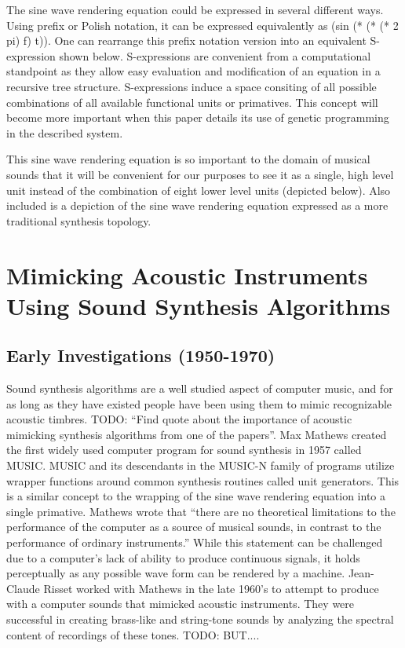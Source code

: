 \documentclass[12pt]{article}
\begin{document}
The sine wave rendering equation could be expressed in several different ways. Using prefix or Polish notation, it can be expressed equivalently as (sin (* (* (* 2 pi) f) t)). One can rearrange this prefix notation version into an equivalent S-expression shown below. S-expressions are convenient from a computational standpoint as they allow easy evaluation and modification of an equation in a recursive tree structure. S-expressions induce a space consiting of all possible combinations of all available functional units or primatives. This concept will become more important when this paper details its use of genetic programming in the described system.
	
This sine wave rendering equation is so important to the domain of musical sounds that it will be convenient for our purposes to see it as a single, high level unit instead of the combination of eight lower level units (depicted below). Also included is a depiction of the sine wave rendering equation expressed as a more traditional synthesis topology.
	
\section{Mimicking Acoustic Instruments Using Sound Synthesis Algorithms}
\subsection{Early Investigations (1950-1970)}
Sound synthesis algorithms are a well studied aspect of computer music, and for as long as they have existed people have been using them to mimic recognizable acoustic timbres. TODO: ``Find quote about the importance of acoustic mimicking synthesis algorithms from one of the papers''. Max Mathews created the first widely used computer program for sound synthesis in 1957 called MUSIC. MUSIC and its descendants in the MUSIC-N family of programs utilize wrapper functions around common synthesis routines called unit generators. This is a similar concept to the wrapping of the sine wave rendering equation into a single primative. Mathews wrote that ``there are no theoretical limitations to the performance of the computer as a source of musical sounds, in contrast to the performance of ordinary instruments.'' \citep{mathews01111963} While this statement can be challenged due to a computer's lack of ability to produce continuous signals, it holds perceptually as any possible wave form can be rendered by a machine. Jean-Claude Risset worked with Mathews in the late 1960's to attempt to produce with a computer sounds that mimicked acoustic instruments. They were successful in creating brass-like and string-tone sounds by analyzing the spectral content of recordings of these tones. TODO: BUT....
\end{document}

